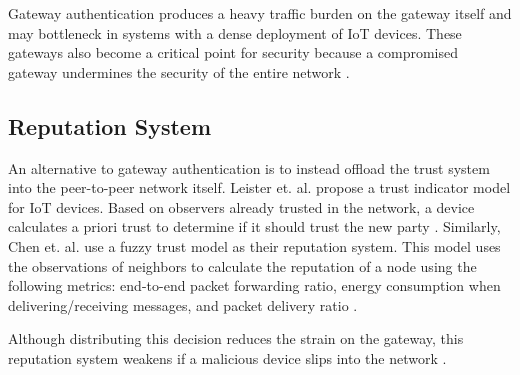 Gateway authentication produces a heavy traffic burden on the gateway itself and may bottleneck in systems with a dense deployment of \gls{IoT} devices. These gateways also become a critical point for security because a compromised gateway undermines the security of the entire network \cite{authmodels}. 

\subsection{Reputation System}

An alternative to gateway authentication is to instead offload the trust system into the peer-to-peer network itself. Leister et. al. propose a trust indicator model for \gls{IoT} devices. Based on observers already trusted in the network, a device calculates a priori trust to determine if it should trust the new party \cite{trustindicator}. Similarly, Chen et. al. use a fuzzy trust model as their reputation system. This model uses the observations of neighbors to calculate the reputation of a node using the following metrics: end-to-end packet forwarding ratio, energy consumption when delivering/receiving messages, and packet delivery ratio \cite{DongChen2011}. 

Although distributing this decision reduces the strain on the gateway, this reputation system weakens if a malicious device slips into the network \cite{authmodels}.